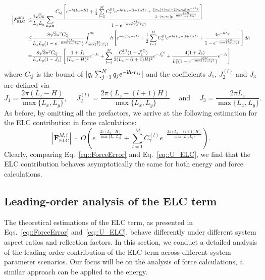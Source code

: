\begin{equation}
\resizebox{0.98\hsize}{!}{$
\begin{aligned}
\left|\bm{F}_{\text{ELC}}^{M,i}\right|\leq &\frac{4\sqrt{3}\pi}{L_xL_y}\sum_{\bm{h}\neq \bm{0}} \frac{C_Q\left[e^{-h(L_z-H)}+\frac{1}{2}\sum\limits_{l=1}^{M}C^{(l)}_{\gamma}e^{-h(L_z-(l+1)H)}+\frac{(|\gamma_{\T u}|+|\gamma_{\T d}| + 2|\gamma_{\T u}\gamma_{\T d}|)e^{-hL_z}}{1-|\gamma_{\T u}\gamma_{\T d}|e^{-\frac{4\pi H}{\max\{L_x,L_y\}}}}\right]}{1-e^{-\frac{2\pi L_z}{\max\{L_x,L_y\}}}}\\
\leq& \frac{8\sqrt{3}\pi^2 C_Q}{L_xL_y(1-e^{-\frac{2\pi L_z}{\max\{L_x,L_y\}}})}\int_{\frac{2\pi}{\max\{L_x,L_y\}}}^{\infty}h\left[e^{-h(L_z-H)}+\frac{1}{2}\sum\limits_{l=1}^{M}C^{(l)}_{\gamma}e^{-h(L_z-(l+1)H)}+\frac{4e^{-hL_z}}{1-e^{-\frac{4\pi H}{\max\{L_x,L_y\}}}}\right]dh\\
=&\frac{8\sqrt{3}\pi^2 C_Q}{L_xL_y(1-J_3)}\left[\frac{1+J_1}{(L_z-H)^2}e^{-J_1}+\sum_{l=1}^{M}\frac{C_{\gamma}^{(l)}(1+J_2^{(l)})}{2(L_z-(l+1)H)^2}e^{-J_2^{(l)}}+\frac{4(1+J_3)}{L_z^2(1-e^{-\frac{4\pi H}{\max\{L_x,L_y\}}})}e^{-J_3}\right]
\end{aligned}
$}
\end{equation}
where $C_Q$ is the bound of $|q_i\sum_{j=1}^{N}q_je^{-\mathsf i \bm{h}\cdot\bm{r}_{ij}}|$ and the coefficients $J_1$, $J_2^{(l)}$ and $J_3$ are defined via
\begin{equation}
J_1=\frac{2\pi(L_z-H)}{\max\{L_x,L_y\}},\quad\; J_2^{(l)}= \frac{2\pi(L_z-(l+1)H)}{\max\{L_x,L_y\}}\quad \;\text{and} \quad \; J_3=\frac{2\pi L_z}{\max\{L_x,L_y\}}.
\end{equation}
As before, by omitting all the prefactors, we arrive at the following estimation for the ELC contribution in force calculations:
\begin{equation}\label{eq::ForceError}
\left|\bm{F}_{\text{ELC}}^{M,i}\right|\sim O\left(e^{-\frac{2\pi(L_z-H)}{\max\{L_x,L_y\}}}+\sum_{l=1}^{M}C_{\gamma}^{(l)}e^{-\frac{2\pi(L_z-(l+1)H)}{\max\{L_x,L_y\}}}\right).
\end{equation}
Clearly, comparing Eq.~\eqref{eq::ForceError} and Eq.~\eqref{eq::U_ELC}, we find that the ELC contribution behaves asymptotically the same for both energy and force calculations.

\subsection{Leading-order analysis of the ELC term}\label{sec::leadingerr}
The theoretical estimations of the ELC term, as presented in Eqs.~\eqref{eq::ForceError} and~\eqref{eq::U_ELC}, behave differently under different system aspect ratios and reflection factors.
In this section, we conduct a detailed analysis of the leading-order contribution of the ELC term across different system parameter scenarios. 
Our focus will be on the analysis of force calculations, a similar approach can be applied to the energy.

